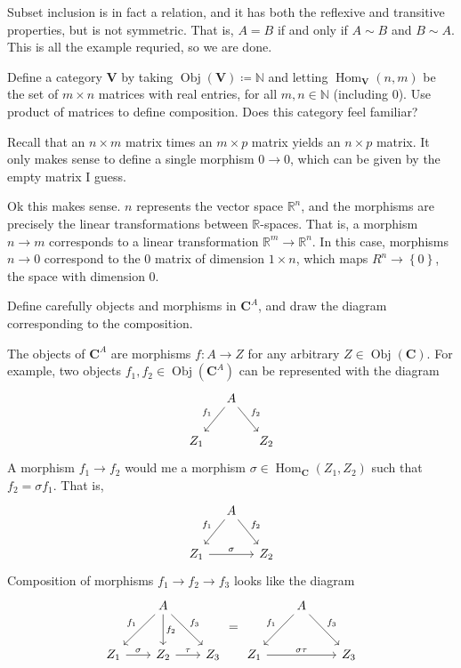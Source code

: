 \documentclass[11pt]{report}
\DeclareMathOperator{\Hom}{Hom}
\DeclareMathOperator{\Obj}{Obj}
\begin{document}
\begin{solution}
	Subset inclusion is in fact a relation, and it has both the reflexive and transitive properties, but is not symmetric. That is, $A=B$ if and only if $A\sim B$ and $B\sim A$. This is all the example requried, so we are done.
\end{solution}
\begin{exercise}
	Define a category $\mathbf{V}$ by taking $\Obj( \mathbf{V} ) \coloneqq \mathbb{N}$ and letting $\Hom_{ \mathbf{V} }(n , m) $ be the set of $m\times n$ matrices with real entries, for all $m,n\in\mathbb{N}$ (including 0). Use product of matrices to define composition. Does this category feel familiar?
\end{exercise}
\begin{solution}
	Recall that an $n\times m$ matrix times an $m\times p$ matrix yields an $n\times p$ matrix. It only makes sense to define a single morphism $0\to 0$, which can be given by the empty matrix I guess. 

	Ok this makes sense. $n$ represents the vector space $\mathbb{R}^n$, and the morphisms are precisely the linear transformations between $\mathbb{R}$-spaces. That is, a morphism $n\to m$ corresponds to a linear transformation $\mathbb{R}^m \to \mathbb{R}^n$. In this case, morphisms $n\to 0$ correspond to the $0$ matrix of dimension $1\times n$, which maps $R^n\to \left\{ 0 \right\} $, the space with dimension 0.
\end{solution}
\begin{exercise}
	Define carefully objects and morphisms in $\mathbf{C}^A$, and draw the diagram corresponding to the composition.
\end{exercise}
\begin{solution}
	The objects of $\mathbf{C}^A$ are morphisms $f : A \to Z$ for any arbitrary $Z\in \Obj( \mathbf{C} ) $. For example, two objects $f_1,f_2\in \Obj( \mathbf{C}^A ) $ can be represented with the diagram
	\[\begin{tikzcd}[row sep=2em, column sep=1em]
		&A\arrow[dr,"f_2"]\arrow[dl,"f_1"']\\
		Z_1&&Z_2
	\end{tikzcd}\]
	A morphism $f_1 \to f_2$ would me a morphism $\sigma \in \Hom_{ \mathbf{C} }(Z_1 , Z_2) $ such that $f_2=\sigma f_1$. That is,
	\[\begin{tikzcd}[row sep=2em, column sep=1em]
		&A\arrow[dl,"f_1"']\arrow[dr,"f_2"]\\
		Z_1\arrow[rr,"\sigma "]&&Z_2
	\end{tikzcd}\]
	Composition of morphisms $f_1\to f_2\to f_3$ looks like the diagram
	\[\begin{tikzcd}[row sep=2.5em, column sep=2em]
		&A\arrow[dl,"f_1"']\arrow[d,"f_2"]\arrow[dr,"f_3"]\\
		Z_1\arrow[r,"\sigma "]&Z_2\arrow[r,"\tau"]&Z_3
	\end{tikzcd} =
	\begin{tikzcd}[row sep=2.5em, column sep=2em]
		&A\arrow[dl,"f_1"']\arrow[dr,"f_3"]\\
		Z_1\arrow[rr,"\sigma \tau "]&&Z_3
	\end{tikzcd}\]
\end{solution}
\end{document}
